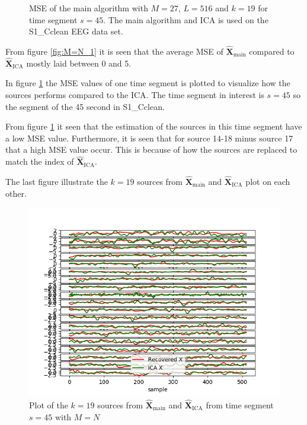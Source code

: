 \begin{figure}[H]
\begin{minipage}[t]{.45\textwidth}
	\caption{MSE of the main algorithm with $M=27$, $L = 516$ and $k=19$ for time segment $s=45$. The main algorithm and ICA is used on the S1\_Cclean EEG data set.}
	\label{fig:M=N_2}
    \end{minipage}
\end{figure}
\noindent  
From figure \ref{fig:M=N_1} it is seen that the average MSE of $\hat{\mathbf{X}}_{\text{main}}$ compared to $\hat{\mathbf{X}}_{\text{ICA}}$ mostly laid between 0 and 5. 

In figure \ref{fig:M=N_2} the MSE values of one time segment is plotted to visualize how the sources performs compared to the ICA. The time segment in interest is $s = 45$ so the segment of the 45 second in S1\_Cclean. 

From figure \ref{fig:M=N_2} it seen that the estimation of the sources in this time segment have a low MSE value. Furthermore, it is seen that for source 14-18 minus source 17 that a high MSE value occur. This is because of how the sources are replaced to match the index of $\hat{\mathbf{X}}_{\text{ICA}}$.

The last figure illustrate the $k = 19$ sources from $\hat{\mathbf{X}}_{\text{main}}$ and $\hat{\mathbf{X}}_{\text{ICA}}$ plot on each other.
\begin{figure}[H]
    \centering
	\includegraphics[scale=0.5]{figures/ch_7/Sources_M=N.png}
	\caption{Plot of the $k = 19$ sources from $\hat{\mathbf{X}}_{\text{main}}$ and $\hat{\mathbf{X}}_{\text{ICA}}$ from time segment $s = 45$ with $M=N$}
	\label{fig:M=N_3}
\end{figure} 
\noindent


